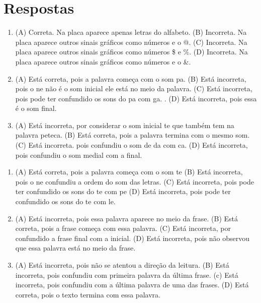 \chapter{Respostas}
\pagestyle{plain}
\footnotesize

\pagecolor{gray!40}


\begin{enumerate}
\item
(A) Correta. Na placa aparece apenas letras do alfabeto.
(B) Incorreta. Na placa aparece outros sinais gráficos como números e o @.
(C) Incorreta. Na placa aparece outros sinais gráficos como números \$ e \%.
(D) Incorreta. Na placa aparece outros sinais gráficos como números e o \&.

\item
(A) Está correta, pois a palavra começa com o som pa.
(B) Está incorreta, pois o ne não é o som inicial ele está no meio da palavra.
(C) Está incorreta, pois pode ter confundido os sons do pa com ga. .
(D) Está incorreta, pois essa é o som final.

\item
(A) Está incorreta, por considerar o som inicial te que também tem na palavra peteca.
(B) Está correta, pois a palavra termina com o mesmo som.
(C) Está incorreta. pois confundiu o som de da com ca.
(D) Está incorreta, pois confundiu o som medial com a final.
\end{enumerate}


\begin{enumerate}
\item
(A) Está correta, pois a palavra começa com o som te
(B) Está incorreta, pois o ne confundiu a ordem do som das letras.
(C) Está incorreta, pois pode ter confundido os sons do te com pe
(D) Está incorreta, pois pode ter confundido os sons do te com le.

\item
(A) Está incorreta, pois essa palavra aparece no meio da frase.
(B) Está correta, pois a frase começa com essa palavra.
(C) Está incorreta, por confundido a frase final com a inicial.
(D) Está incorreta, pois não observou que essa palavra está no meio da frase.

\item
(A) Está incorreta, pois não se atentou a direção da leitura.
(B) Está incorreta, pois confundiu com primeira palavra da última frase.
(c) Está incorreta, pois confundiu com a última palavra de uma das frases.
(D) Está correta, pois o texto termina com essa palavra.
\end{enumerate}

